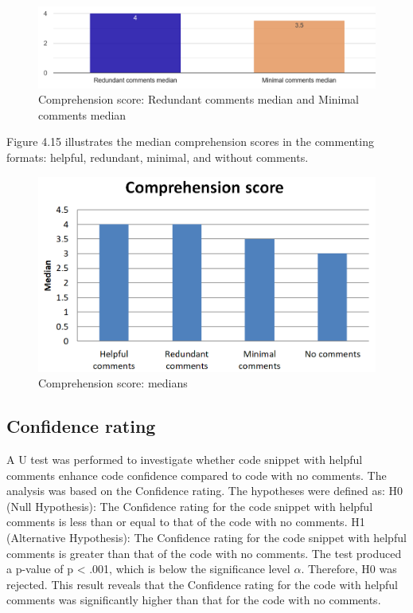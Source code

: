 \begin{figure} [H]
  \centering
  \includegraphics[scale=0.56]{figures/red-min-q3.png}
  \caption{Comprehension score:  Redundant comments median and Minimal comments median}
  \label{fig:AnhangsChor}
\end{figure}


Figure 4.15 illustrates the median comprehension scores in the commenting formats: helpful, redundant, minimal, and without comments.

\begin{figure} [H]
  \centering
  \includegraphics[scale=0.8]{figures/comMed.png}
  \caption{Comprehension score: medians}
  \label{fig:AnhangsChor}
\end{figure}



\subsection{Confidence rating}
A U test was performed to investigate whether code snippet with helpful comments enhance code confidence compared to code with no comments. The analysis was based on the Confidence rating. The hypotheses were defined as:  H0 (Null Hypothesis): The Confidence rating for the code snippet with helpful comments is less than or equal to that of the code with no comments.  H1 (Alternative Hypothesis): The Confidence rating for the code snippet with helpful comments is greater than that of the code with no comments. The test produced a p-value of   p < .001, which is below the significance level $\alpha$. Therefore, H0 was rejected.  This result reveals that the Confidence rating  for the code with helpful comments was significantly higher than that for the code with no comments. 



